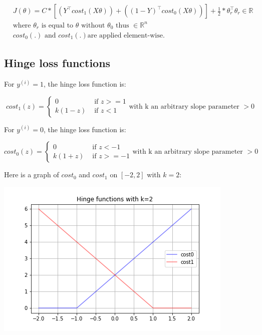 \documentclass[a4paper, 12pt]{article}
\begin{document}
\begin{align*}
& J(\theta) = C * \left[ (Y^{\top}cost_1(X\theta)) + ({(1-Y)}^{\top}cost_0(X\theta)) \right] + \frac{1}{2}*\theta_{r}^{\top}\theta_{r} \in \mathbb{R} \\
& \text{where } \theta_{r} \text{ is equal to } \theta \text{ without } \theta_0 \text{ thus } \in \mathbb{R}^{n} \\
& cost_0(.) \text{ and } cost_1(.) \text{are applied element-wise}.
\end{align*}

\subsection{Hinge loss functions}

For $y^{(i)}=1$, the hinge loss function is:

\begin{equation}
cost_1(z) = 
\begin{cases}
0 & \text{ if } z >= 1 \\
k(1-z) &  \text{ if } z<1
\end{cases}
\text{with k an arbitrary slope parameter } >0
\end{equation}

For $y^{(i)}=0$, the hinge loss function is:

\begin{equation}
cost_0(z) = 
\begin{cases}
0 & \text{ if } z < -1 \\
k(1+z) &  \text{ if } z>=-1
\end{cases}
\text{with k an arbitrary slope parameter } >0
\end{equation}

Here is a graph of $cost_0$ and $cost_1$ on $[-2,2]$ with $k=2$:

\begin{center}
  \includegraphics[scale=0.7]{hinge}
  \label{fig:hinge}
\end{center}
\end{document}
